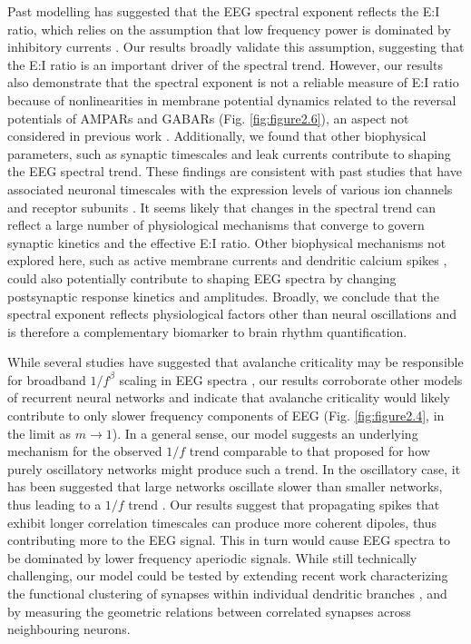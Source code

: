 Past modelling has suggested that the EEG spectral exponent reflects the E:I ratio, which relies on the assumption that low frequency power is dominated by inhibitory currents \cite{Gao2017}. Our results broadly validate this assumption, suggesting that the E:I ratio is an important driver of the spectral trend. However, our results also demonstrate that the spectral exponent is not a reliable measure of E:I ratio because of nonlinearities in membrane potential dynamics related to the reversal potentials of AMPARs and GABARs (Fig. \ref{fig:figure2.6}), an aspect not considered in previous work \cite{Gao2017}. Additionally, we found that other biophysical parameters, such as synaptic timescales and leak currents contribute to shaping the EEG spectral trend. These findings are consistent with past studies that have associated neuronal timescales with the expression levels of various ion channels and receptor subunits \cite{Gao2020}. It seems likely that changes in the spectral trend can reflect a large number of physiological mechanisms that converge to govern synaptic kinetics and the effective E:I ratio. Other biophysical mechanisms not explored here, such as active membrane currents \cite{Reimann2013} and dendritic calcium spikes \cite{Suzuki2017}, could also potentially contribute to shaping EEG spectra by changing postsynaptic response kinetics and amplitudes. Broadly, we conclude that the spectral exponent reflects physiological factors other than neural oscillations and is therefore a complementary biomarker to brain rhythm quantification.

While several studies have suggested that avalanche criticality may be responsible for broadband $1/f^\beta$ scaling in EEG spectra \cite{Beggs2003, He2014, Lombardi2017, Petermann2009}, our results corroborate other models of recurrent neural networks \cite{Chaudhuri2018} and indicate that avalanche criticality would likely contribute to only slower frequency components of EEG (Fig. \ref{fig:figure2.4}, in the limit as $m\rightarrow 1$). In a general sense, our model suggests an underlying mechanism for the observed $1/f$ trend comparable to that proposed for how purely oscillatory networks might produce such a trend. In the oscillatory case, it has been suggested that large networks oscillate slower than smaller networks, thus leading to a $1/f$ trend \cite{Buzsaki2004, Buzsaki2023}. Our results suggest that propagating spikes that exhibit longer correlation timescales can produce more coherent dipoles, thus contributing more to the EEG signal. This in turn would cause EEG spectra to be dominated by lower frequency aperiodic signals. While still technically challenging, our model could be tested by extending recent work characterizing the functional clustering of synapses within individual dendritic branches \cite{Iacaruso2017, Ju2020, Kerlin2019, Lafourcade2022}, and by measuring the geometric relations between correlated synapses across neighbouring neurons.

